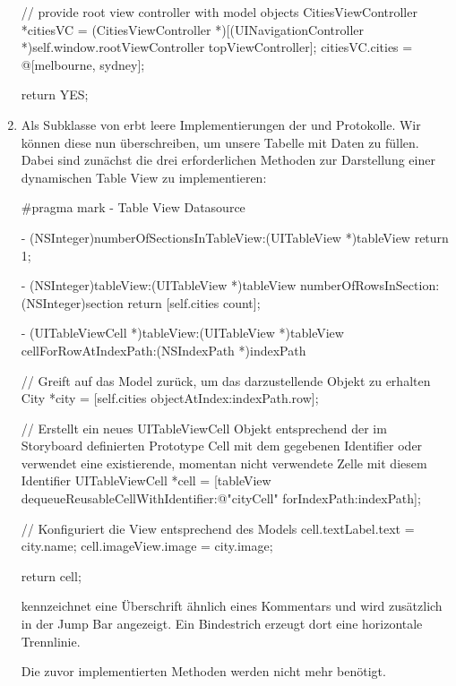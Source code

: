 \documentclass[parskip=half, final]{scrreprt}
\begin{document}
\begin{lecture}
\begin{enumerate}
\begin{objclst}
{    // provide root view controller with model objects
    CitiesViewController *citiesVC = (CitiesViewController *)[(UINavigationController *)self.window.rootViewController topViewController];
    citiesVC.cities = @[melbourne, sydney];
    
    return YES;
}

\end{objclst}

\item Als Subklasse von  erbt  leere Implementierungen der  und  Protokolle. Wir können diese nun überschreiben, um unsere Tabelle mit Daten zu füllen. Dabei sind zunächst die drei erforderlichen Methoden zur Darstellung einer dynamischen Table View zu implementieren:

\begin{objclst}
#pragma mark - Table View Datasource

- (NSInteger)numberOfSectionsInTableView:(UITableView *)tableView {
    return 1;
}

- (NSInteger)tableView:(UITableView *)tableView numberOfRowsInSection:(NSInteger)section {
    return [self.cities count];
}

- (UITableViewCell *)tableView:(UITableView *)tableView cellForRowAtIndexPath:(NSIndexPath *)indexPath {

    // Greift auf das Model zurück, um das darzustellende Objekt zu erhalten
    City *city = [self.cities objectAtIndex:indexPath.row];

    // Erstellt ein neues UITableViewCell Objekt entsprechend der im Storyboard definierten Prototype Cell mit dem gegebenen Identifier oder verwendet eine existierende, momentan nicht verwendete Zelle mit diesem Identifier
    UITableViewCell *cell = [tableView dequeueReusableCellWithIdentifier:@"cityCell" forIndexPath:indexPath];

    // Konfiguriert die View entsprechend des Models
    cell.textLabel.text = city.name;
    cell.imageView.image = city.image;

    return cell;
}
\end{objclst}

 kennzeichnet eine Überschrift ähnlich eines Kommentars und wird zusätzlich in der Jump Bar angezeigt. Ein Bindestrich \objc{-} erzeugt dort eine horizontale Trennlinie.

Die zuvor implementierten Methoden werden nicht mehr benötigt.


\end{enumerate}
\end{lecture}
\end{document}
